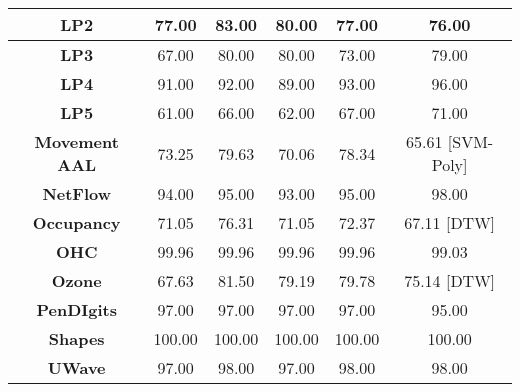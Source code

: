 \documentclass[preprint,12pt,3p]{elsarticle}
\begin{document}
\begin{table*}[htpb]
\begin{adjustbox}{width=1 \linewidth}
\begin{tabularx}{1.4 \textwidth}{|C|C|C|C|C|C|}
    \textbf{LP2} & 77.00 & 83.00 & 80.00 & 77.00 & 76.00 \cite{schafer2017multivariate} \\
    \hline
    \textbf{LP3} & 67.00 & 80.00 & 80.00 & 73.00 & 79.00 \cite{schafer2017multivariate} \\
    \hline
    \textbf{LP4} & 91.00 & 92.00 & 89.00 & 93.00 & 96.00 \cite{schafer2017multivariate} \\
    \hline
    \textbf{LP5} & 61.00 & 66.00 & 62.00 & 67.00 & 71.00 \cite{schafer2017multivariate} \\
    \hline
    \textbf{Movement AAL} & 73.25 & 79.63 & 70.06 & 78.34 & 65.61 [SVM-Poly] \\
    \hline
    \textbf{NetFlow} & 94.00 & 95.00 & 93.00 & 95.00 & 98.00 \cite{schafer2017multivariate} \\
    \hline
    \textbf{Occupancy} & 71.05 & 76.31 & 71.05 & 72.37 & 67.11 [DTW] \\
    \hline
   {\textbf{OHC}} & 99.96 & 99.96 & 99.96 & 99.96 & 99.03 \cite{pei2017multivariate} \\
    \hline
    \textbf{Ozone} & 67.63 & 81.50 & 79.19 & 79.78 & 75.14 [DTW] \\
    \hline
    \textbf{PenDIgits} & 97.00 & 97.00 & 97.00 & 97.00 & 95.00 \cite{ARkernel} \\
    \hline
    \textbf{Shapes} & 100.00 & 100.00 & 100.00 & 100.00 & 100.00 \cite{schafer2017multivariate} \\
    \hline
    \textbf{UWave} & 97.00 & 98.00 & 97.00 & 98.00 & 98.00 \cite{schafer2017multivariate} \\

\end{tabularx}
\end{adjustbox}
\end{table*}
\end{document}
